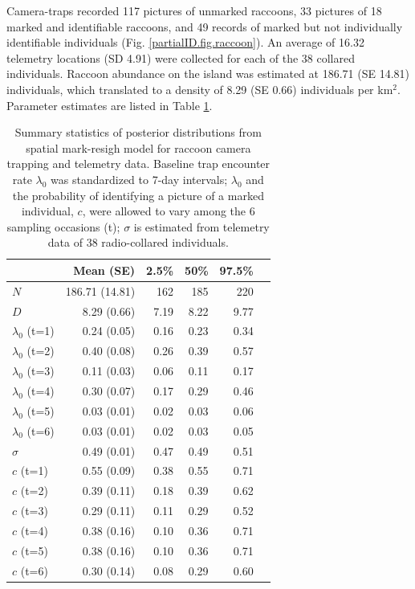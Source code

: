 Camera-traps recorded 117 pictures of unmarked raccoons, 33 pictures
of 18 marked and identifiable raccoons, and 49 records of marked but
not individually identifiable individuals
(Fig. \ref{partialID.fig.raccoon}). An average of 16.32 telemetry
locations (SD 4.91) were collected for each of the 38 collared
individuals. Raccoon abundance on the island was estimated at 186.71
(SE 14.81) individuals, which translated to a density of 8.29 (SE
0.66) individuals per km$^2$. Parameter estimates are listed in
Table \ref{partialID.tab.raccoons}.

\begin{table}%
\centering
\caption{Summary statistics of posterior distributions
  from spatial mark-resigh model for raccoon camera trapping and telemetry data. Baseline trap encounter rate $\lambda_0$ was standardized to 7-day intervals; $\lambda_0$ and the probability of identifying a picture of a marked individual, $c$, were allowed to vary among the 6 sampling occasions (t); $\sigma$ is estimated from telemetry data of 38 radio-collared individuals.}
\begin{tabular}{lrrrrr}
\hline
   &	Mean (SE) &	2.5\% &	50\%	& 97.5\% \\
 \hline
$N$	& 186.71 (14.81) & 162 & 185	& 220 \\
$D$	& 8.29 (0.66)	& 7.19	& 8.22	& 9.77 \\
$\lambda_0$ (t=1)	& 0.24 (0.05) & 0.16 & 0.23 & 0.34 \\
$\lambda_0$ (t=2)	& 0.40 (0.08)	& 0.26	& 0.39	& 0.57 \\
$\lambda_0$ (t=3)	& 0.11 (0.03) & 0.06 & 0.11	& 0.17 \\
$\lambda_0$ (t=4)	& 0.30 (0.07)	& 0.17	& 0.29	& 0.46 \\
$\lambda_0$ (t=5)	& 0.03 (0.01)	& 0.02	& 0.03	& 0.06 \\
$\lambda_0$ (t=6)	& 0.03 (0.01)	& 0.02	& 0.03	& 0.05 \\
$\sigma$	& 0.49 (0.01)	& 0.47	& 0.49	& 0.51 \\
$c$ (t=1)	& 0.55 (0.09)	& 0.38	& 0.55	& 0.71 \\
$c$ (t=2)	& 0.39 (0.11)	& 0.18	& 0.39	& 0.62 \\
$c$ (t=3)	& 0.29 (0.11) & 0.11	& 0.29	& 0.52 \\
$c$ (t=4)	& 0.38 (0.16)	& 0.10	& 0.36	& 0.71 \\
$c$ (t=5)	& 0.38 (0.16)	& 0.10	& 0.36	& 0.71 \\
$c$ (t=6)	& 0.30 (0.14)	& 0.08	& 0.29	& 0.60 \\
 \hline
\end{tabular}
\label{partialID.tab.raccoons}
\end{table}

